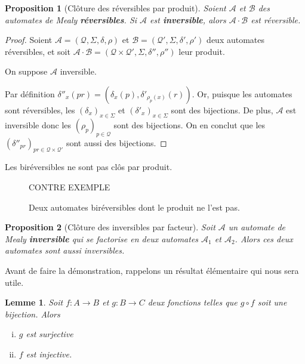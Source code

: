 \documentclass[11pt,a4paper]{article}
\newtheorem{prop}{Proposition}
\newtheorem{lemma}{Lemme}
\begin{document}
\begin{prop}[Clôture des réversibles par produit]
  Soient $\mathcal{A}$ et $\mathcal{B}$ des automates de Mealy \textbf{réversibles}. Si $\mathcal{A}$ est \textbf{inversible}, alors $\mathcal{A}\cdot\mathcal{B}$ est réversible.
\end{prop}

\begin{proof}
  Soient $\mathcal{A}=\left(\mathcal{Q}, \Sigma, \delta, \rho\right)$ et $\mathcal{B}=\left(\mathcal{Q'}, \Sigma, \delta', \rho'\right)$ deux automates réversibles, et soit $\mathcal{A\cdot B}=\left(\mathcal{Q\times Q'}, \Sigma, \delta'', \rho''\right)$ leur produit.


  On suppose $\mathcal{A}$ inversible.


  Par définition $\delta''_x(pr)=(\delta_x(p), \delta'_{\rho_p(x)}(r))$. Or, puisque les automates sont réversibles, les $(\delta_x)_{x\in\Sigma}$ et ${(\delta'_x)}_{x\in\Sigma}$ sont des bijections. De plus, $\mathcal{A}$ est inversible donc les ${(\rho_p)}_{p\in \mathcal{Q}}$ sont des bijections. On en conclut que les ${(\delta''_{pr})}_{pr\in\mathcal{Q}\times\mathcal{Q'}}$ sont aussi des bijections.
\end{proof}

Les biréversibles ne sont pas clôs par produit.

\begin{figure}
  CONTRE EXEMPLE
  \caption{Deux automates biréversibles dont le produit ne l'est pas.}
\end{figure}

\begin{prop}[Clôture des inversibles par facteur]\label{prop_cloture_inv_facteurs}
  Soit $\mathcal{A}$ un automate de Mealy \textbf{inversible} qui se factorise en deux automates $\mathcal{A}_1$ et $\mathcal{A}_2$. Alors ces deux automates sont aussi inversibles.
\end{prop}

Avant de faire la démonstration, rappelons un résultat élémentaire qui nous sera utile.
\begin{lemma}\label{lem:bij}
  Soit $f:A\rightarrow B$ et $g:B\rightarrow C$ deux fonctions telles que $g\circ f$ soit une bijection.
  Alors
  \begin{enumerate}[(i)]
  \item $g$ est surjective
  \item $f$ est injective.
  \end{enumerate}
\end{lemma}
\end{document}
